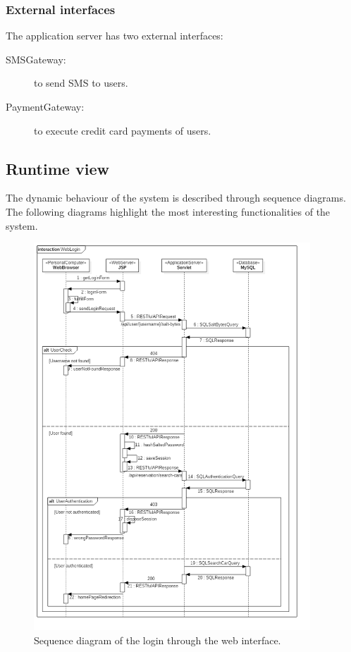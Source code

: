\subsubsection{External interfaces}

The application server has two external interfaces:
\begin{description}
	\item[SMSGateway:] to send SMS to users.
	\item[PaymentGateway:] to execute credit card payments of users.
\end{description}

\subsection{Runtime view}

The dynamic behaviour of the system is described through sequence diagrams. The following diagrams highlight the most interesting functionalities of the system.

\begin{figure}[H]
	\noindent
    	\centering
    	\includegraphics[height=550px, keepaspectratio]{diagrams/SequenceLogin.png}
	\caption{Sequence diagram of the login through the web interface.}
    	\label{fig:sequence-login}
\end{figure}


